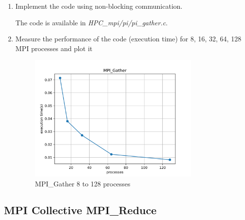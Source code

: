 \documentclass[12pt]{article}
\begin{document}
\begin{enumerate}
  
  \item Implement the code using non-blocking communication.
    
  The code is available in \textit{HPC\_mpi/pi/pi\_gather.c}.
  \item  Measure the performance of the code (execution time) for 8, 16, 32,  64, 128 MPI processes and plot it
   
  \begin{figure}[H]
    \centering
    \includegraphics[width=0.8\textwidth]{graph-pi-mpi-gather.png}
    \caption{MPI\_Gather 8 to 128 processes}
    \label{fig:blocking}
  \end{figure}
\end{enumerate}


\subsection{MPI Collective MPI\_Reduce}
\end{document}
